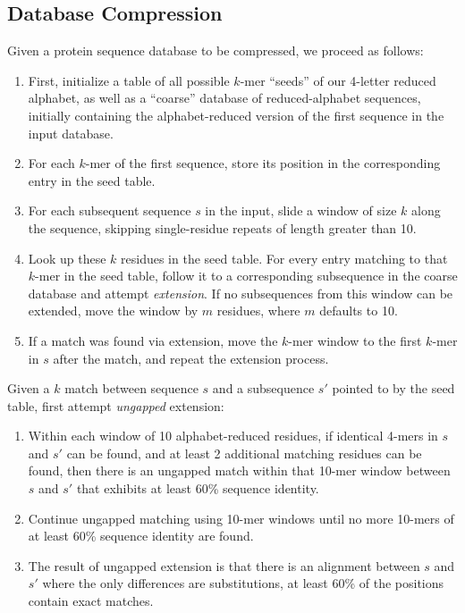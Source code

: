\documentclass{amsbook}
\theoremstyle{definition}
\theoremstyle{remark}
\numberwithin{equation}{section}
\begin{document}
\subsection*{Database Compression}

Given a protein sequence database to be compressed, we proceed as follows:
\begin{enumerate}
        \item First, initialize a table of all possible $k$-mer ``seeds'' of
        our 4-letter reduced alphabet, as well as a ``coarse'' database of
        reduced-alphabet sequences, initially containing the alphabet-reduced
        version of the first sequence in the input database.
        \item For each $k$-mer of the first sequence, store its position in the
        corresponding entry in the seed table.
        \item For each subsequent sequence $s$ in the input, slide a window of 
        size $k$ along the sequence, skipping single-residue repeats of length
        greater than 10.
        \item Look up these $k$ residues in the seed table.
        For every entry matching to that $k$-mer in the seed table, follow
        it to a corresponding subsequence in the coarse database and attempt
        \textit{extension}.
        If no subsequences from this window can be extended, move the window
        by $m$ residues, where $m$ defaults to 10.
        \item If a match was found via extension, move the $k$-mer window to
        the first $k$-mer in $s$ after the match, and repeat the extension
        process.
\end{enumerate}
        
Given a $k$ match between sequence $s$ and a subsequence $s'$ pointed to by the
seed table, first attempt \textit{ungapped} extension:
\begin{enumerate}
        \item Within each window of 10 alphabet-reduced residues, if identical 
        4-mers in $s$ and $s'$ can be found, and at least 2 additional matching 
        residues can be found, then there is an ungapped match within that
        10-mer window between $s$ and $s'$ that exhibits at least 60\% sequence
        identity.
        \item Continue ungapped matching using 10-mer windows until no more
        10-mers of at least 60\% sequence identity are found.
        \item The result of ungapped extension is that there is an alignment 
        between $s$ and $s'$ where the only differences are substitutions,
        at least 60\% of the positions contain exact matches.
\end{enumerate}
        
\end{document}
